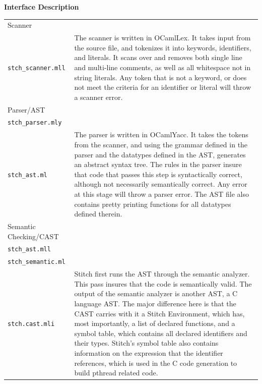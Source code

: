 \documentclass[11pt, oneside]{article}   	%
\begin{document}
\newpage
\Large\textbf{Interface Description}\\[1em]
\normalsize
\begin{tabular}{ l p{12cm} }
Scanner\\\verb|stch_scanner.mll| & The scanner is written in OCamlLex.  It takes input from the source file, and tokenizes it into keywords, identifiers, and literals.  It scans over and removes both single line and multi-line comments, as well as all whitespace not in string literals.  Any token that is not a keyword, or does not meet the criteria for an identifier or literal will throw a scanner error.\\[.5em]
Parser/AST\\ \verb|stch_parser.mly|\\\verb|stch_ast.ml| & The parser is written in OCamlYacc.  It takes the tokens from the scanner, and using the grammar defined in the parser and the datatypes defined in the AST, generates an abstract syntax tree.  The rules in the parser insure that code that passes this step is syntactically correct, although not necessarily semantically correct.  Any error at this stage will throw a parser error.  The AST file also contains pretty printing functions for all datatypes defined therein.\\[.5em]
Semantic Checking/CAST\\ \verb|stch_ast.mll|\\\verb|stch_semantic.ml|\\\verb|stch.cast.mli| & Stitch first runs the AST through the semantic analyzer.  This pass insures that the code is semantically valid.  The output of the semantic analyzer is another AST, a C language AST.  The major difference here is that the CAST carries with it a Stitch Environment, which has, most importantly, a list of declared functions, and a symbol table, which contains all declared identifiers and their types.  Stitch's symbol table also contains information on the expression that the identifier references, which is used in the C code generation to build pthread related code.\\[.5em]
\end{tabular}
\newpage
\end{document}
